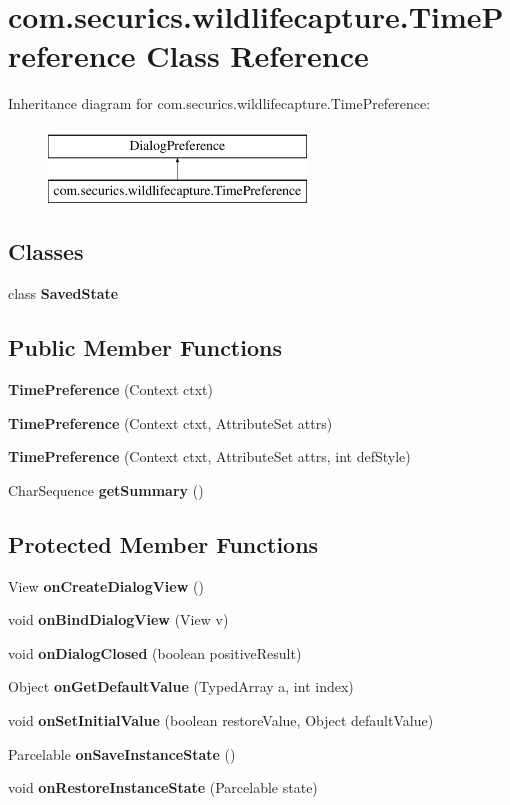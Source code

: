 \section{com.\+securics.\+wildlifecapture.\+Time\+Preference Class Reference}
\label{classcom_1_1securics_1_1wildlifecapture_1_1_time_preference}
Inheritance diagram for com.\+securics.\+wildlifecapture.\+Time\+Preference\+:\begin{figure}[H]
\begin{center}
\leavevmode
\includegraphics[height=2.000000cm]{classcom_1_1securics_1_1wildlifecapture_1_1_time_preference}
\end{center}
\end{figure}
\subsection*{Classes}
\begin{DoxyCompactItemize}
\item 
class {\bfseries Saved\+State}
\end{DoxyCompactItemize}
\subsection*{Public Member Functions}
\begin{DoxyCompactItemize}
\item 
{\bf Time\+Preference} (Context ctxt)
\item 
{\bf Time\+Preference} (Context ctxt, Attribute\+Set attrs)
\item 
{\bf Time\+Preference} (Context ctxt, Attribute\+Set attrs, int def\+Style)
\item 
Char\+Sequence {\bf get\+Summary} ()
\end{DoxyCompactItemize}
\subsection*{Protected Member Functions}
\begin{DoxyCompactItemize}
\item 
View {\bf on\+Create\+Dialog\+View} ()
\item 
void {\bf on\+Bind\+Dialog\+View} (View v)
\item 
void {\bf on\+Dialog\+Closed} (boolean positive\+Result)
\item 
Object {\bf on\+Get\+Default\+Value} (Typed\+Array a, int index)
\item 
void {\bf on\+Set\+Initial\+Value} (boolean restore\+Value, Object default\+Value)
\item 
Parcelable {\bf on\+Save\+Instance\+State} ()
\item 
void {\bf on\+Restore\+Instance\+State} (Parcelable state)
\end{DoxyCompactItemize}
